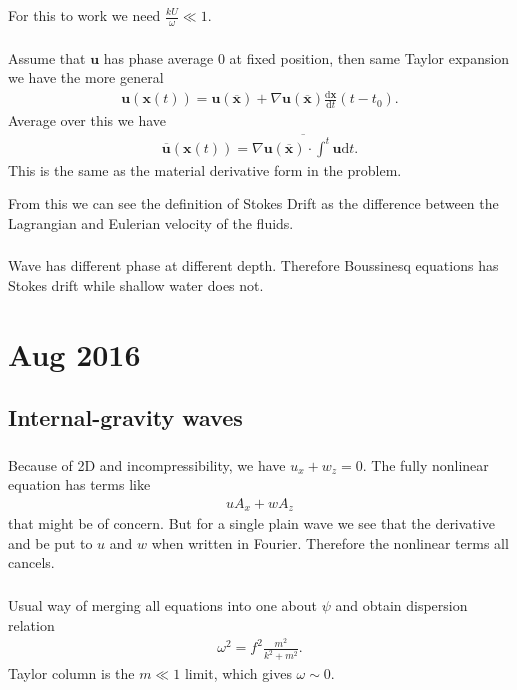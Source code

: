 \documentclass[11pt,letterpaper]{book}
\theoremstyle{definition}
\newcommand{\de}{\mathrm{d}}
\newcommand{\dsp}{\displaystyle}
\newcommand{\ve}[1]{\boldsymbol{#1}}
\begin{document}
For this to work we need $\dsp{\frac{kU}{\omega}\ll 1}$.

\subsection{}
Assume that $\ve u$ has phase average 0 at fixed position, then same Taylor expansion we have the more general
\begin{align*}
    \ve u(\ve x(t)) = \ve u(\overline{\ve x})+\nabla\ve u(\overline{\ve x})\frac{\de \ve x}{\de t}(t-t_0).
\end{align*}
Average over this we have
\begin{align*}
    \overline{\ve u}(\ve x(t)) = \overline{\nabla\ve u(\overline{\ve x})\cdot \int^t \ve u\de t}.
\end{align*}
This is the same as the material derivative form in the problem. 

From this we can see the definition of Stokes Drift as the difference between the Lagrangian and Eulerian velocity of the fluids. 

\subsection{}
Wave has different phase at different depth. Therefore Boussinesq equations has Stokes drift while shallow water does not. 


\chapter{Aug 2016}
\section{Internal-gravity waves}\label{prob:aug_2016_1}
\subsection{}
Because of 2D and incompressibility, we have $u_x+w_z = 0$. The fully nonlinear equation has terms like
\begin{align*}
    uA_x+wA_z
\end{align*}
that might be of concern. But for a single plain wave we see that the derivative and be put to $u$ and $w$ when written in Fourier. Therefore the nonlinear terms all cancels.

\subsection{}
Usual way of merging all equations into one about $\psi$ and obtain dispersion relation
\begin{align*}
    \omega^2 = f^2\frac{m^2}{k^2+m^2}.
\end{align*}
Taylor column is the $m\ll 1$ limit, which gives $\omega\sim 0$.
\end{document}
